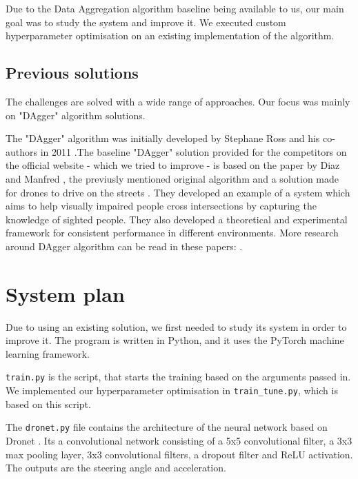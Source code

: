 \documentclass{article}
\begin{document}
Due to the Data Aggregation algorithm baseline being available to us, our main goal was to study the system and improve it. We executed custom hyperparameter optimisation on an existing implementation of the algorithm.

\subsection{Previous solutions}

The challenges are solved with a wide range of approaches. Our focus was mainly on "DAgger" algorithm solutions.

The "DAgger" algorithm was initially developed by Stephane Ross and his co-authors in 2011 \citep {ross2011reduction}.The baseline "DAgger" solution provided for the competitors on the official website - which we tried to improve - is based on the paper by Diaz and Manfred \citep{diaz2018interactive}, the previusly mentioned original algorithm \citep {ross2011reduction} and a solution made for drones to drive on the streets \citep {loquercio2018dronet}. They developed an example of a system which aims to help visually impaired people cross intersections by capturing the knowledge of sighted people. They also developed a theoretical and experimental framework for consistent performance in different environments. More research around DAgger algorithm can be read in these papers: \citep{prakash2020exploring} \citep{bicer2019sample} \citep{cui2019uncertainty} \citep{kamrani2020mariodagger} \citep{elers2019continual} \citep{hussein2017imitation} \citep{DBLP:journals/corr/abs-1901-04772}.



\section{System plan}

Due to using an existing solution, we first needed to study its system in order to improve it. The program is written in Python, and it uses the PyTorch machine learning framework. 

\verb|train.py| is the script, that starts the training based on the arguments passed in. We implemented our hyperparameter optimisation in \verb|train_tune.py|, which is based on this script. 

The \verb|dronet.py| file contains the architecture of the neural network based on Dronet \citep{loquercio2018dronet}. Its a convolutional network consisting of a 5x5 convolutional filter, a 3x3 max pooling layer, 3x3 convolutional filters, a dropout filter and ReLU activation. The outputs are the steering angle and acceleration. 
\end{document}
